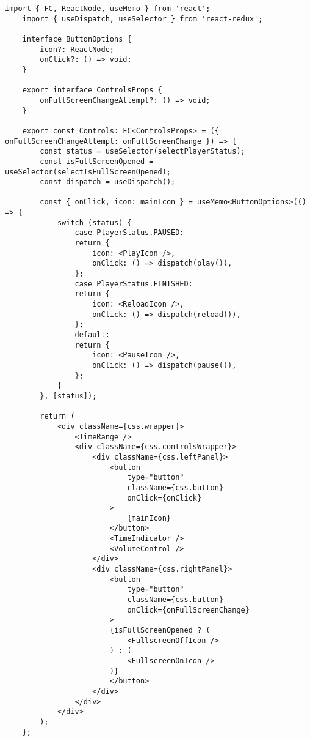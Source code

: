 \begin{lstlisting}[caption={config.ts}]
	import { FC, ReactNode, useMemo } from 'react';
	import { useDispatch, useSelector } from 'react-redux';
	
	interface ButtonOptions {
		icon?: ReactNode;
		onClick?: () => void;
	}
	
	export interface ControlsProps {
		onFullScreenChangeAttempt?: () => void;
	}
	
	export const Controls: FC<ControlsProps> = ({ onFullScreenChangeAttempt: onFullScreenChange }) => {
		const status = useSelector(selectPlayerStatus);
		const isFullScreenOpened = useSelector(selectIsFullScreenOpened);
		const dispatch = useDispatch();
		
		const { onClick, icon: mainIcon } = useMemo<ButtonOptions>(() => {
			switch (status) {
				case PlayerStatus.PAUSED:
				return {
					icon: <PlayIcon />,
					onClick: () => dispatch(play()),
				};
				case PlayerStatus.FINISHED:
				return {
					icon: <ReloadIcon />,
					onClick: () => dispatch(reload()),
				};
				default:
				return {
					icon: <PauseIcon />,
					onClick: () => dispatch(pause()),
				};
			}
		}, [status]);
		
		return (
			<div className={css.wrapper}>
				<TimeRange />
				<div className={css.controlsWrapper}>
					<div className={css.leftPanel}>
						<button
							type="button"
							className={css.button}
							onClick={onClick}
						>
							{mainIcon}
						</button>
						<TimeIndicator />
						<VolumeControl />
					</div>
					<div className={css.rightPanel}>
						<button
							type="button"
							className={css.button}
							onClick={onFullScreenChange}
						>
						{isFullScreenOpened ? (
							<FullscreenOffIcon />
						) : (
							<FullscreenOnIcon />
						)}
						</button>
					</div>
				</div>
			</div>
		);
	};
\end{lstlisting}

